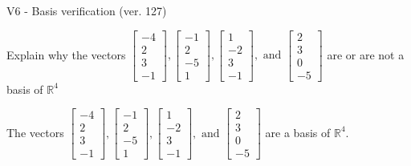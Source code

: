 \begin{exercise}
  \begin{exerciseTitle}V6 - Basis verification (ver. 127)\end{exerciseTitle}
  \begin{exerciseStatement}
    Explain why the vectors \(\left[\begin{array}{r}
-4 \\
2 \\
3 \\
-1
\end{array}\right] , \left[\begin{array}{r}
-1 \\
2 \\
-5 \\
1
\end{array}\right] , \left[\begin{array}{r}
1 \\
-2 \\
3 \\
-1
\end{array}\right] , \text{ and } \left[\begin{array}{r}
2 \\
3 \\
0 \\
-5
\end{array}\right]\) are or are not a basis of \(\mathbb{R}^4\)	


  \end{exerciseStatement}
  \begin{exerciseAnswer}
   The vectors \(\left[\begin{array}{r}
-4 \\
2 \\
3 \\
-1
\end{array}\right] , \left[\begin{array}{r}
-1 \\
2 \\
-5 \\
1
\end{array}\right] , \left[\begin{array}{r}
1 \\
-2 \\
3 \\
-1
\end{array}\right] , \text{ and } \left[\begin{array}{r}
2 \\
3 \\
0 \\
-5
\end{array}\right]\) 
  	 are  a basis of \(\mathbb{R}^4\).
  


  \end{exerciseAnswer}
\end{exercise}